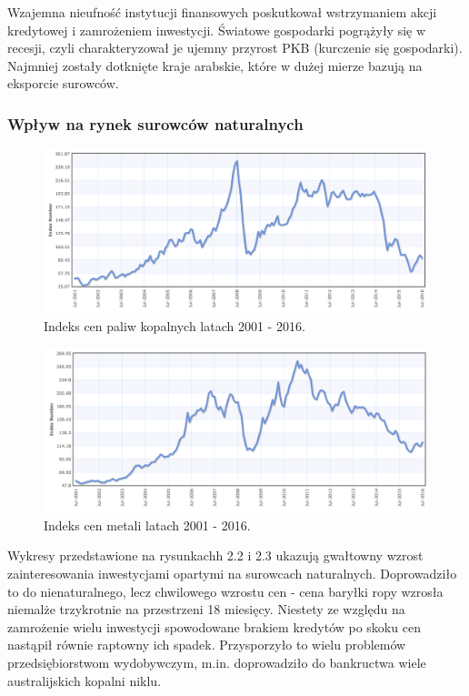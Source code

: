 Wzajemna nieufność instytucji finansowych poskutkował wstrzymaniem akcji kredytowej i zamrożeniem inwestycji. Światowe gospodarki pogrążyły się w recesji, czyli charakteryzował je ujemny przyrost PKB (kurczenie się gospodarki). Najmniej zostały dotknięte kraje arabskie, które w dużej mierze bazują na eksporcie surowców.

\subsubsection{Wpływ na rynek surowców naturalnych}

\begin{figure}[h] \centering %
	\includegraphics[scale=0.4]{img/fuel_index.png}
	\caption{Indeks cen paliw kopalnych latach 2001 - 2016.\cite{indexmundi}} %
	\label{fuelPriceIndex}
\end{figure}

\begin{figure}[h] \centering %
	\includegraphics[scale=0.4]{img/metal_index.png}
	\caption{Indeks cen metali latach 2001 - 2016.\cite{indexmundi}} %
	\label{metalPriceIndex}
\end{figure}

Wykresy przedstawione na rysunkachh 2.2 i 2.3 ukazują gwałtowny wzrost zainteresowania inwestycjami opartymi na surowcach naturalnych. Doprowadziło to do nienaturalnego, lecz chwilowego wzrostu cen - cena baryłki ropy wzrosła niemalże trzykrotnie na przestrzeni 18 miesięcy. Niestety ze względu na zamrożenie wielu inwestycji spowodowane brakiem kredytów po skoku cen nastąpił równie raptowny ich spadek. Przysporzyło to wielu problemów przedsiębiorstwom wydobywczym, m.in. doprowadziło do bankructwa wiele australijskich kopalni niklu.

